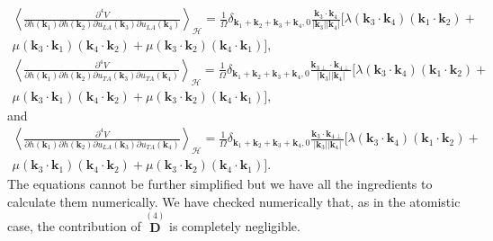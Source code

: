 \begin{multline}
\left\langle\frac{\partial^{4}V}{\partial h(\boldsymbol{k}_{1})\partial h(\boldsymbol{k}_{2})\partial u_{LA}(\boldsymbol{k}_{3})\partial u_{LA}(\boldsymbol{k}_{4})}\right\rangle_{\mathcal{H}}=\frac{1}{\Omega}\delta_{\boldsymbol{
 k}_{1}+\boldsymbol{k}_{2}+\boldsymbol{k}_{3}+\boldsymbol{k}_{4},0}\frac{\boldsymbol{k}_{3}\cdot\boldsymbol{k}_{4}}{|\boldsymbol{k}_{3}||\boldsymbol{k}_{4}|}[\lambda(\boldsymbol{k}_{3}\cdot\boldsymbol{k}_{4})(\boldsymbol{k}_{
 1}\cdot\boldsymbol{k}_{2})+\\\mu(\boldsymbol{k}_{3}\cdot\boldsymbol{k}_{1})(\boldsymbol{k}_{4}\cdot\boldsymbol{k}_{2})+\mu(\boldsymbol{k}_{3}\cdot\boldsymbol{k}_{2})(\boldsymbol{k}_{4}\cdot\boldsymbol{k}_{1})],
\end{multline}
\begin{multline}
 \left\langle\frac{\partial^{4}V}{\partial h(\boldsymbol{k}_{1})\partial h(\boldsymbol{k}_{2})\partial u_{TA}(\boldsymbol{k}_{3})\partial u_{TA}(\boldsymbol{k}_{4})}\right\rangle_{\mathcal{H}}=\frac{1}{\Omega}\delta_{\boldsymbol{
 k}_{1}+\boldsymbol{k}_{2}+\boldsymbol{k}_{3}+\boldsymbol{k}_{4},0}\frac{\boldsymbol{k}_{3\perp}\cdot\boldsymbol{k}_{4\perp}}{|\boldsymbol{k}_{3}||\boldsymbol{k}_{4}|}[\lambda(\boldsymbol{k}_{3}\cdot\boldsymbol{k}_{4})(\boldsymbol{k}_{
 1}\cdot\boldsymbol{k}_{2})+\\\mu(\boldsymbol{k}_{3}\cdot\boldsymbol{k}_{1})(\boldsymbol{k}_{4}\cdot\boldsymbol{k}_{2})+\mu(\boldsymbol{k}_{3}\cdot\boldsymbol{k}_{2})(\boldsymbol{k}_{4}\cdot\boldsymbol{k}_{1})],
\end{multline}
and
\begin{multline}
 \left\langle\frac{\partial^{4}V}{\partial h(\boldsymbol{k}_{1})\partial h(\boldsymbol{k}_{2})\partial u_{LA}(\boldsymbol{k}_{3})\partial u_{TA}(\boldsymbol{k}_{4})}\right\rangle_{\mathcal{H}}=\frac{1}{\Omega}\delta_{\boldsymbol{
 k}_{1}+\boldsymbol{k}_{2}+\boldsymbol{k}_{3}+\boldsymbol{k}_{4},0}\frac{\boldsymbol{k}_{3}\cdot\boldsymbol{k}_{4\perp}}{|\boldsymbol{k}_{3}||\boldsymbol{k}_{4}|}[\lambda(\boldsymbol{k}_{3}\cdot\boldsymbol{k}_{4})(\boldsymbol{k}_{
 1}\cdot\boldsymbol{k}_{2})+\\\mu(\boldsymbol{k}_{3}\cdot\boldsymbol{k}_{1})(\boldsymbol{k}_{4}\cdot\boldsymbol{k}_{2})+\mu(\boldsymbol{k}_{3}\cdot\boldsymbol{k}_{2})(\boldsymbol{k}_{4}\cdot\boldsymbol{k}_{1})].
\end{multline}
The equations cannot be further simplified but we have all the ingredients to calculate them numerically. We have
checked numerically that, as in the atomistic case, the contribution of $\overset{(4)}{\boldsymbol{D}}$ is
completely negligible. \\

